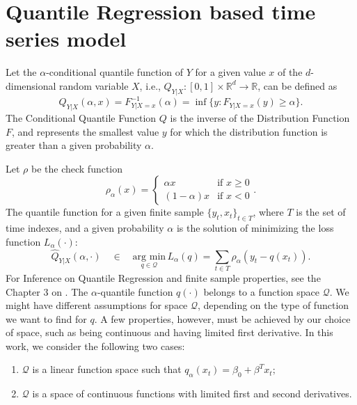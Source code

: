\chapter{Quantile Regression based time series model} \label{sec:qr1}

Let the $\alpha$-conditional quantile function of $Y$ for a given value $x$ of the $d$-dimensional random variable $X$, i.e., $Q_{Y|X}:[0,1] \times \mathbb{R}^d \rightarrow \mathbb{R}$, can be defined as %
	\begin{equation}
	Q_{Y|X}(\alpha,x) = F_{Y|X=x}^{-1}(\alpha) = \inf\{y: F_{Y|X=x}(y) \geq \alpha\}.
	\label{eq:quantile-function}
	\end{equation}
The Conditional Quantile Function $Q$ is the inverse of the Distribution Function $F$, and represents the smallest value $y$ for which the distribution function is greater than a given probability $\alpha$.

Let $\rho$ be the check function 
	\begin{equation}\label{eq:check-function}
	\rho_{\alpha}(x)=\begin{cases}
	\alpha x & \text{if }x\geq0\\
	(1-\alpha)x & \text{if }x<0
	\end{cases}.
	\end{equation}
The quantile function for a given finite sample $\{y_t,x_t \}_{t \in T}$, where $T$  is the set of time indexes, and a given probability $\alpha$ is the solution of minimizing the loss function $L_\alpha(\cdot)$:
	\begin{equation}
	\hat{Q}_{Y|X}(\alpha,\cdot)\quad\in\quad  \underset{q\in\mathcal{Q}}{\text{arg min}}\, L_\alpha(q) = \sum_{t\in T}\rho_{\alpha}(y_{t}-q(x_t)).\label{eq:optim-lqr1} 
	\end{equation}
For Inference on Quantile Regression and finite sample properties, see the Chapter 3 on \cite{koenker2005quantile}.
The $\alpha$-quantile function $q(\cdot)$ belongs to a function space $\mathcal{Q}$. We might have different assumptions for space $\mathcal{Q}$, depending on the type of function we want to find 
for $q$. A few properties, however, must be achieved by our choice of space, such as being continuous and having limited first derivative. In this work, we consider the following two cases: 
\begin{enumerate}
	\item $\mathcal{Q}$ is a linear function space such that
		$q_\alpha(x_t) = \beta_0 + \beta^T x_t;$ 
	\item $\mathcal{Q}$ is a space of continuous functions with limited first and second derivatives.
\end{enumerate}


